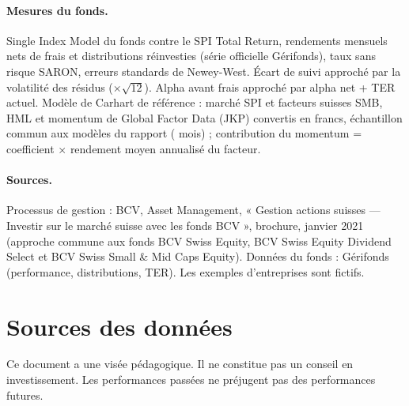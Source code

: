 \documentclass[11pt,a4paper]{article}
\begin{document}
\paragraph{Mesures du fonds.} Single Index Model du fonds contre le SPI Total Return, rendements mensuels nets de frais et distributions réinvesties (série officielle Gérifonds), taux sans risque SARON, erreurs standards de Newey-West. Écart de suivi approché par la volatilité des résidus ($\times\sqrt{12}$). Alpha avant frais approché par alpha net + TER actuel. Modèle de Carhart de référence : marché SPI et facteurs suisses SMB, HML et momentum de Global Factor Data (JKP) convertis en francs, échantillon commun aux modèles du rapport (\CarN{} mois) ; contribution du momentum = coefficient $\times$ rendement moyen annualisé du facteur.

\paragraph{Sources.} Processus de gestion : BCV, Asset Management, « Gestion actions suisses — Investir sur le marché suisse avec les fonds BCV », brochure, janvier 2021 (approche commune aux fonds BCV Swiss Equity, BCV Swiss Equity Dividend Select et BCV Swiss Small \& Mid Caps Equity). Données du fonds : Gérifonds (performance, distributions, TER). Les exemples d'entreprises sont fictifs.

\section{Sources des données}

\begin{center}\small

\end{center}

\vfill
{\small\color{gris} Ce document a une visée pédagogique. Il ne constitue pas un conseil en investissement. Les performances passées ne préjugent pas des performances futures.}
\end{document}
